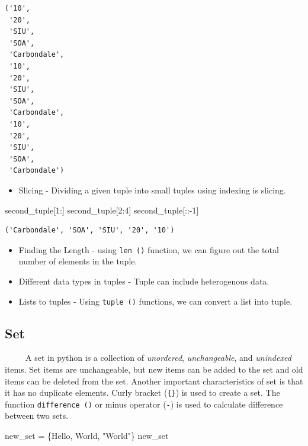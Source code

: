 \documentclass[
  letterpaper,
  DIV=11,
  numbers=noendperiod]{scrreprt}
\newenvironment{Shaded}{\begin{snugshade}}{\end{snugshade}}
\newcommand{\DecValTok}[1]{\textcolor[rgb]{0.68,0.00,0.00}{#1}}
\newcommand{\NormalTok}[1]{\textcolor[rgb]{0.00,0.23,0.31}{#1}}
\newcommand{\OperatorTok}[1]{\textcolor[rgb]{0.37,0.37,0.37}{#1}}
\newcommand{\StringTok}[1]{\textcolor[rgb]{0.13,0.47,0.30}{#1}}
\providecommand{\tightlist}{%
  \setlength{\itemsep}{0pt}\setlength{\parskip}{0pt}}
\begin{document}
\begin{verbatim}
('10',
 '20',
 'SIU',
 'SOA',
 'Carbondale',
 '10',
 '20',
 'SIU',
 'SOA',
 'Carbondale',
 '10',
 '20',
 'SIU',
 'SOA',
 'Carbondale')
\end{verbatim}

\begin{itemize}
\tightlist
\item
  Slicing - Dividing a given tuple into small tuples using indexing is
  slicing.
\end{itemize}

\begin{Shaded}
\begin{Highlighting}[]
\NormalTok{second\_tuple[}\DecValTok{1}\NormalTok{:]}
\NormalTok{second\_tuple[}\DecValTok{2}\NormalTok{:}\DecValTok{4}\NormalTok{]}
\NormalTok{second\_tuple[::}\OperatorTok{{-}}\DecValTok{1}\NormalTok{]}
\end{Highlighting}
\end{Shaded}

\begin{verbatim}
('Carbondale', 'SOA', 'SIU', '20', '10')
\end{verbatim}

\begin{itemize}
\item
  Finding the Length - using \texttt{len\ ()} function, we can figure
  out the total number of elements in the tuple.
\item
  Different data types in tuples - Tuple can include heterogenous data.
\item
  Lists to tuples - Using \texttt{tuple\ ()} functions, we can convert a
  list into tuple.
\end{itemize}

\subsection{Set}\label{set}

~~~~~A set in python is a collection of \emph{unordered},
\emph{unchangeable}, and \emph{unindexed} items. Set items are
unchangeable, but new items can be added to the set and old items can be
deleted from the set. Another important characteristics of set is that
it has no duplicate elements. Curly bracket (\texttt{\{\}}) is used to
create a set. The function \texttt{difference\ ()} or minus operator
(\texttt{-}) is used to calculate difference between two sets.

\begin{Shaded}
\begin{Highlighting}[]
\NormalTok{new\_set }\OperatorTok{=}\NormalTok{ \{}\StringTok{\textquotesingle{}Hello\textquotesingle{}}\NormalTok{, }\StringTok{\textquotesingle{}World\textquotesingle{}}\NormalTok{, }\StringTok{"World"}\NormalTok{\}}
\NormalTok{new\_set }
\end{Highlighting}
\end{Shaded}
\end{document}
